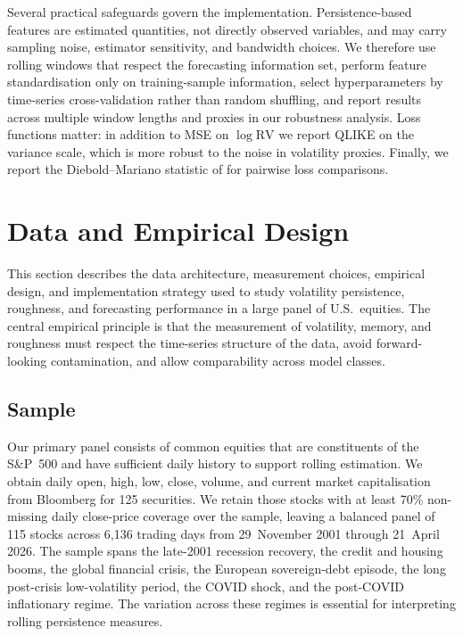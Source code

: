 \documentclass[11pt,a4paper]{article}
\newcommand{\RV}{\mathrm{RV}}
\begin{document}
Several practical safeguards govern the implementation. Persistence-based
features are estimated quantities, not directly observed variables, and
may carry sampling noise, estimator sensitivity, and bandwidth choices.
We therefore use rolling windows that respect the forecasting information
set, perform feature standardisation only on training-sample information,
select hyperparameters by time-series cross-validation rather than random
shuffling, and report results across multiple window lengths and proxies
in our robustness analysis. Loss functions matter: in addition to MSE on
$\log\RV$ we report QLIKE on the variance scale, which is more robust to
the noise in volatility proxies. Finally, we report the Diebold--Mariano
statistic of \citet{diebold1995comparing} for pairwise loss comparisons.

\section{Data and Empirical Design}
\label{sec:data}

This section describes the data architecture, measurement choices,
empirical design, and implementation strategy used to study volatility
persistence, roughness, and forecasting performance in a large panel of
U.S.\ equities. The central empirical principle is that the measurement
of volatility, memory, and roughness must respect the time-series
structure of the data, avoid forward-looking contamination, and allow
comparability across model classes.

\subsection{Sample}

Our primary panel consists of common equities that are constituents of
the S\&P~500 and have sufficient daily history to support rolling
estimation. We obtain daily open, high, low, close, volume, and current
market capitalisation from Bloomberg for 125 securities. We retain those
stocks with at least 70\% non-missing daily close-price coverage over the
sample, leaving a balanced panel of 115 stocks across 6,136 trading days
from 29~November 2001 through 21~April 2026. The sample spans the
late-2001 recession recovery, the credit and housing booms, the global
financial crisis, the European sovereign-debt episode, the long
post-crisis low-volatility period, the COVID shock, and the post-COVID
inflationary regime. The variation across these regimes is essential for
interpreting rolling persistence measures.
\end{document}
